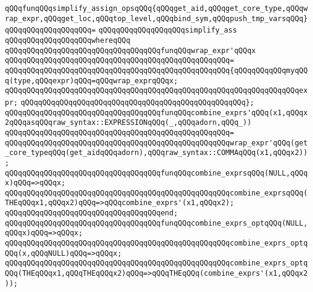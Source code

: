 \verb|qQQqfunqQQqsimplify_assign_opsqQQq{qQQqget_aid,qQQqget_core_type,qQQqwrap_expr,qQQqget_loc,qQQqtop_level,qQQqbind_sym,qQQqpush_tmp_varsqQQq}|\newline
\verb|qQQqqQQqqQQqqQQqqQQq=|\newline
\verb|qQQqqQQqqQQqqQQqqQQqsimplify_ass|\newline
\verb|qQQqqQQqqQQqqQQqqQQqwhereqQQq|\newline
\newline
\verb|qQQqqQQqqQQqqQQqqQQqqQQqqQQqqQQqqQQqfunqQQqwrap_expr'qQQqx|\newline
\verb|qQQqqQQqqQQqqQQqqQQqqQQqqQQqqQQqqQQqqQQqqQQqqQQqqQQq=|\newline
\verb|qQQqqQQqqQQqqQQqqQQqqQQqqQQqqQQqqQQqqQQqqQQqqQQqqQQq{qQQqqQQqqQQqmyqQQq(type,qQQqexpr)qQQq=qQQqwrap_exprqQQqx;|\newline
\verb|qQQqqQQqqQQqqQQqqQQqqQQqqQQqqQQqqQQqqQQqqQQqqQQqqQQqqQQqqQQqqQQqqQQqexpr;|\newline
\verb|qQQqqQQqqQQqqQQqqQQqqQQqqQQqqQQqqQQqqQQqqQQqqQQqqQQq};|\newline
\newline
\verb|qQQqqQQqqQQqqQQqqQQqqQQqqQQqqQQqqQQqfunqQQqcombine_exprs'qQQq(x1,qQQqx2qQQqasqQQqraw_syntax::EXPRESSIONqQQq(_,qQQqadorn,qQQq_))|\newline
\verb|qQQqqQQqqQQqqQQqqQQqqQQqqQQqqQQqqQQqqQQqqQQqqQQqqQQq=|\newline
\verb|qQQqqQQqqQQqqQQqqQQqqQQqqQQqqQQqqQQqqQQqqQQqqQQqqQQqwrap_expr'qQQq(get_core_typeqQQq(get_aidqQQqadorn),qQQqraw_syntax::COMMAqQQq(x1,qQQqx2));|\newline
\newline
\verb|qQQqqQQqqQQqqQQqqQQqqQQqqQQqqQQqqQQqfunqQQqcombine_exprsqQQq(NULL,qQQqx)qQQq=>qQQqx;|\newline
\verb|qQQqqQQqqQQqqQQqqQQqqQQqqQQqqQQqqQQqqQQqqQQqqQQqqQQqcombine_exprsqQQq(THEqQQqx1,qQQqx2)qQQq=>qQQqcombine_exprs'(x1,qQQqx2);|\newline
\verb|qQQqqQQqqQQqqQQqqQQqqQQqqQQqqQQqqQQqend;|\newline
\newline
\verb|qQQqqQQqqQQqqQQqqQQqqQQqqQQqqQQqqQQqfunqQQqcombine_exprs_optqQQq(NULL,qQQqx)qQQq=>qQQqx;|\newline
\verb|qQQqqQQqqQQqqQQqqQQqqQQqqQQqqQQqqQQqqQQqqQQqqQQqqQQqcombine_exprs_optqQQq(x,qQQqNULL)qQQq=>qQQqx;|\newline
\verb|qQQqqQQqqQQqqQQqqQQqqQQqqQQqqQQqqQQqqQQqqQQqqQQqqQQqcombine_exprs_optqQQq(THEqQQqx1,qQQqTHEqQQqx2)qQQq=>qQQqTHEqQQq(combine_exprs'(x1,qQQqx2));|\newline
